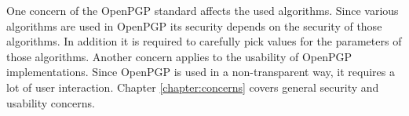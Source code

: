 One concern of the OpenPGP standard affects the used algorithms. Since various algorithms are used in OpenPGP its security depends on the security of those algorithms. In addition it is required to carefully pick values for the parameters of those algorithms. Another concern applies to the usability of OpenPGP implementations. Since OpenPGP is used in a non-transparent way, it requires a lot of user interaction.
Chapter \ref{chapter:concerns} covers general security and usability concerns.

%
%
%
%
%
%
%
%
%
